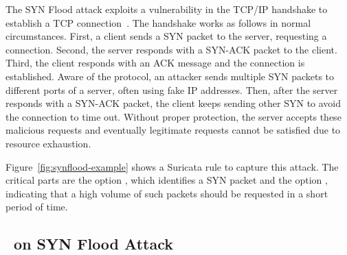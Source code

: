\documentclass[runningheads]{llncs}
\begin{document}
The SYN Flood attack exploits a vulnerability in the TCP/IP handshake
to establish a TCP connection~\cite{cloudfare-synflood}. The handshake
works as follows in normal circumstances. First, a client sends a SYN
packet to the server, requesting a connection. Second, the server
responds with a SYN-ACK packet to the client. Third, the client
responds with an ACK message and the connection is established. Aware
of the protocol, an attacker sends multiple SYN packets to different
ports of a server, often using fake IP addresses. Then, after the
server responds with a SYN-ACK packet, the client keeps sending other
SYN to avoid the connection to time out. Without proper protection,
the server accepts these malicious requests and eventually legitimate
requests cannot be satisfied due to resource exhaustion.

Figure~\ref{fig:synflood-example} shows a Suricata rule to capture
this attack. The critical parts are the option ,
which identifies a SYN packet and the option , indicating that a high
volume of such packets should be requested in a short period of
time.

\subsection{\tname\ on SYN Flood Attack}

  
\end{document}
